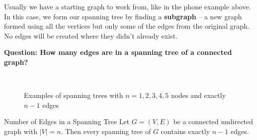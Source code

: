 Usually we have a starting graph to work from, like in the phone example above.  In this case, we form our spanning tree by finding a \textbf{subgraph} -- a new graph formed using all the vertices but only some of the edges from the original graph.  No edges will be created where they didn't already exist.

\textbf{Question: How many edges are in a spanning tree of a connected graph?}

\begin{figure}[h!]
\centering
{}\\
\vspace{1cm}

\caption{Examples of spanning trees with \( n = 1, 2, 3, 4, 5 \) nodes and exactly \( n-1 \) edges}
\end{figure}

\begin{lemma}{Number of Edges in a Spanning Tree}
Let \( G = (V, E) \) be a connected undirected graph with \( |V| = n \).  
Then every spanning tree of \( G \) contains exactly \( n - 1 \) edges.
\end{lemma}

